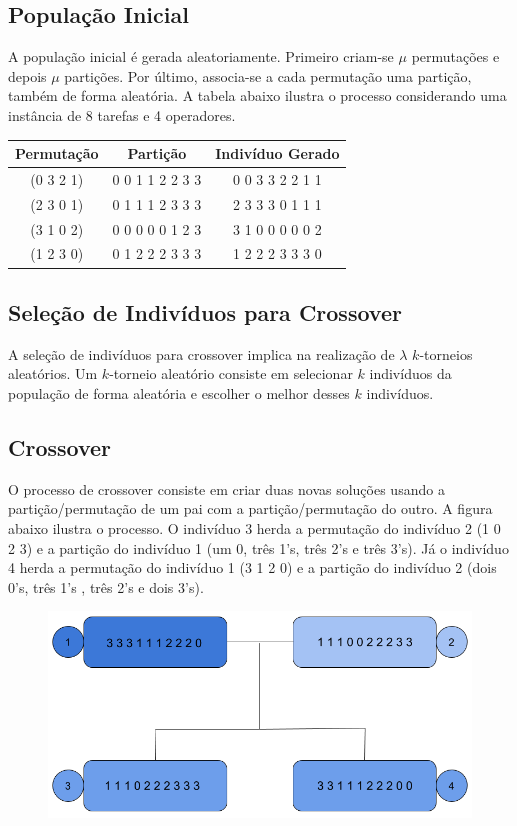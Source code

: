 \documentclass{article}
\begin{document}
\subsection{População Inicial}
\quad A população inicial é gerada aleatoriamente. Primeiro criam-se $\mu$ permutações e depois $\mu$ partições. Por último, associa-se a cada permutação uma partição, também de forma aleatória. A tabela abaixo ilustra o processo considerando uma instância de 8 tarefas e 4 operadores.
\begin{table}[!htp]
\centering
\begin{tabular}{ccc}
\hline
\textbf{Permutação} & \textbf{Partição} & \textbf{Indivíduo Gerado} \\ \hline
(0 3 2 1) & 0 0 1 1 2 2 3 3 & 0 0 3 3 2 2 1 1 \\ \hline
(2 3 0 1) & 0 1 1 1 2 3 3 3 & 2 3 3 3 0 1 1 1 \\ \hline
(3 1 0 2) & 0 0 0 0 0 1 2 3 & 3 1 0 0 0 0 0 2 \\ \hline
(1 2 3 0) & 0 1 2 2 2 3 3 3 & 1 2 2 2 3 3 3 0 \\ \hline
\end{tabular}
\end{table}

\subsection{Seleção de Indivíduos para Crossover}
\quad A seleção de indivíduos para crossover implica na realização de $\lambda$ $k$-torneios aleatórios. Um $k$-torneio aleatório consiste em selecionar $k$ indivíduos da população de forma aleatória e escolher o melhor desses $k$ indivíduos.
 
\subsection{Crossover}
\quad O processo de crossover consiste em criar duas novas soluções usando a partição/permutação de um pai com a partição/permutação do outro. A figura abaixo ilustra o processo. O indivíduo 3 herda a permutação do indivíduo 2 (1 0 2 3)  e a partição do indivíduo 1 (um 0, três 1's, três 2's e três 3's). Já o indivíduo 4 herda a permutação do indivíduo 1 (3 1 2 0) e a partição do indivíduo 2 (dois 0's, três 1's , três 2's e dois 3's).
\begin{figure}[tph!]
\centering
\includegraphics[scale=0.35]{figure2}
\end{figure}
\end{document}
